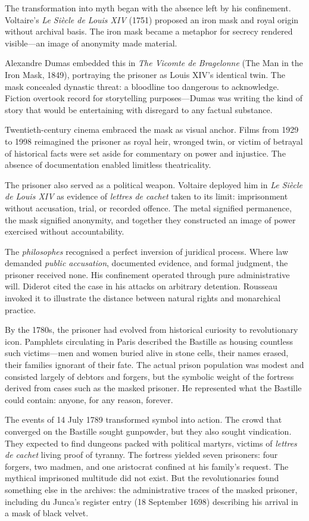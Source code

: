 The transformation into myth began with the absence left by his confinement. Voltaire's \textit{Le Siècle de Louis XIV} (1751) proposed an iron mask and royal origin without archival basis. The iron mask became a metaphor for secrecy rendered visible—an image of anonymity made material.

Alexandre Dumas embedded this in \textit{The Vicomte de Bragelonne} (The Man in the Iron Mask, 1849), portraying the prisoner as Louis XIV's identical twin. The mask concealed dynastic threat: a bloodline too dangerous to acknowledge. Fiction overtook record for storytelling purposes—Dumas was writing the kind of story that would be entertaining with disregard to any factual substance.

Twentieth-century cinema embraced the mask as visual anchor. Films from 1929 to 1998 reimagined the prisoner as royal heir, wronged twin, or victim of betrayal of historical facts were set aside for commentary on power and injustice. The absence of documentation enabled limitless theatricality.

The prisoner also served as a political weapon. Voltaire deployed him in \textit{Le Siècle de Louis XIV} as evidence of \textit{lettres de cachet} taken to its limit: imprisonment without accusation, trial, or recorded offence. The metal signified permanence, the mask signified anonymity, and together they constructed an image of power exercised without accountability.

The \textit{philosophes} recognised a perfect inversion of juridical process. Where law demanded \textit{public accusation}, documented evidence, and formal judgment, the prisoner received none. His confinement operated through pure administrative will. Diderot cited the case in his attacks on arbitrary detention. Rousseau invoked it to illustrate the distance between natural rights and monarchical practice.

By the 1780s, the prisoner had evolved from historical curiosity to revolutionary icon. Pamphlets circulating in Paris described the Bastille as housing countless such victims—men and women buried alive in stone cells, their names erased, their families ignorant of their fate. The actual prison population was modest and consisted largely of debtors and forgers, but the symbolic weight of the fortress derived from cases such as the masked prisoner. He represented what the Bastille could contain: anyone, for any reason, forever.

The events of 14 July 1789 transformed symbol into action. The crowd that converged on the Bastille sought gunpowder, but they also sought vindication. They expected to find dungeons packed with political martyrs, victims of \textit{lettres de cachet} living proof of tyranny. The fortress yielded seven prisoners: four forgers, two madmen, and one aristocrat confined at his family's request. The mythical imprisoned multitude did not exist. But the revolutionaries found something else in the archives: the administrative traces of the masked prisoner, including du Junca's register entry (18 September 1698) describing his arrival in \QSOpen{}a mask of black velvet.\QSClose{}

